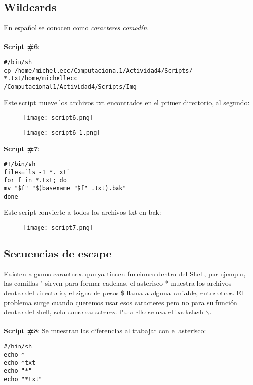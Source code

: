 \documentclass[a4paper]{article}
\begin{document}
\subsection{Wildcards}
En español se conocen como \textit{caracteres comodín}. \\
\\
\textbf{Script \#6:}

\begin{verbatim}
#/bin/sh
cp /home/michellecc/Computacional1/Actividad4/Scripts/ *.txt/home/michellecc
/Computacional1/Actividad4/Scripts/Img
\end{verbatim}

Este script mueve los archivos txt encontrados en el primer directorio, al segundo:
\begin{figure}[h!]
  \texttt{[image: script6.png]}
  \centering
  \label{fig:18}
\end{figure}
\begin{figure}[h!]
  \texttt{[image: script6\_1.png]}
  \centering
  \label{fig:19}
\end{figure}

\textbf{Script \#7:}
\begin{verbatim}
#!/bin/sh
files=`ls -1 *.txt`
for f in *.txt; do
mv "$f" "$(basename "$f" .txt).bak"
done
\end{verbatim}

Este script convierte a todos los archivos txt en bak:
\begin{figure}[h!]
  \texttt{[image: script7.png]}
  \centering
  \label{fig:20}
\end{figure}

\subsection{Secuencias de escape}
Existen algunos caracteres que ya tienen funciones dentro del Shell, por ejemplo, las comillas " sirven para formar cadenas, el asterisco * muestra los archivos dentro del directorio, el signo de pesos \$ llama a alguna variable, entre otros. El problema surge cuando queremos usar esos caracteres pero no para su función dentro del shell, solo como caracteres. Para ello se usa el backslash $\backslash$. \\
\\
\textbf{Script \#8}: Se muestran las diferencias al trabajar con el asterisco: 
 \begin{verbatim}
#/bin/sh
echo *
echo *txt
echo "*"
echo "*txt"
 \end{verbatim}
\end{document}
